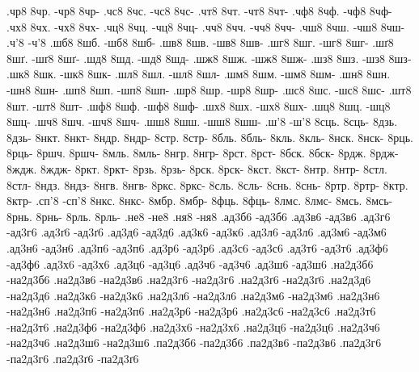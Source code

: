 {.чр8 8чр. -чр8 8чр-
.чс8 8чс. -чс8 8чс-
.чт8 8чт. -чт8 8чт-
.чф8 8чф. -чф8 8чф-
.чх8 8чх. -чх8 8чх-
.чц8 8чц. -чц8 8чц-
.чч8 8чч. -чч8 8чч-
.чш8 8чш. -чш8 8чш-
.ч'8 -ч'8
.шб8 8шб. -шб8 8шб-
.шв8 8шв. -шв8 8шв-
.шг8 8шг. -шг8 8шг-
.шґ8 8шґ. -шґ8 8шґ-
.шд8 8шд. -шд8 8шд-
.шж8 8шж. -шж8 8шж-
.шз8 8шз. -шз8 8шз-
.шк8 8шк. -шк8 8шк-
.шл8 8шл. -шл8 8шл-
.шм8 8шм. -шм8 8шм-
.шн8 8шн. -шн8 8шн-
.шп8 8шп. -шп8 8шп-
.шр8 8шр. -шр8 8шр-
.шс8 8шс. -шс8 8шс-
.шт8 8шт. -шт8 8шт-
.шф8 8шф. -шф8 8шф-
.шх8 8шх. -шх8 8шх-
.шц8 8шц. -шц8 8шц-
.шч8 8шч. -шч8 8шч-
.шш8 8шш. -шш8 8шш-
.ш'8 -ш'8
%
%
%
8сць. 8сць-
8дзь. 8дзь-
8нкт. 8нкт-
8ндр. 8ндр-
8стр. 8стр-
8бль. 8бль-
8кль. 8кль-
8нск. 8нск-
8рць. 8рць-
8ршч. 8ршч-
8мль. 8мль-
8нгр. 8нгр-
8рст. 8рст-
8бск. 8бск-
8рдж. 8рдж-
8ждж. 8ждж-
8ркт. 8ркт-
8рзь. 8рзь-
8рск. 8рск-
8кст. 8кст-
8нтр. 8нтр-
8стл. 8стл-
8ндз. 8ндз-
8нгв. 8нгв-
8ркс. 8ркс-
8сль. 8сль-
8снь. 8снь-
8ртр. 8ртр-
8ктр. 8ктр-
.сп'8 -сп'8
8нкс. 8нкс-
8мбр. 8мбр-
8фць. 8фць-
8лмс. 8лмс-
8мсь. 8мсь-
8рнь. 8рнь-
8рль. 8рль-
%
%
%
.не8 -не8
.ня8 -ня8
%
%
%
.ад3б6 -ад3б6
.ад3в6 -ад3в6
.ад3г6 -ад3г6
.ад3ґ6 -ад3ґ6
.ад3д6 -ад3д6
.ад3к6 -ад3к6
.ад3л6 -ад3л6
.ад3м6 -ад3м6
.ад3н6 -ад3н6
.ад3п6 -ад3п6
.ад3р6 -ад3р6
.ад3с6 -ад3с6
.ад3т6 -ад3т6
.ад3ф6 -ад3ф6
.ад3х6 -ад3х6
.ад3ц6 -ад3ц6
.ад3ч6 -ад3ч6
.ад3ш6 -ад3ш6
.на2д3б6 -на2д3б6
.на2д3в6 -на2д3в6
.на2д3г6 -на2д3г6
.на2д3ґ6 -на2д3ґ6
.на2д3д6 -на2д3д6
.на2д3к6 -на2д3к6
.на2д3л6 -на2д3л6
.на2д3м6 -на2д3м6
.на2д3н6 -на2д3н6
.на2д3п6 -на2д3п6
.на2д3р6 -на2д3р6
.на2д3с6 -на2д3с6
.на2д3т6 -на2д3т6
.на2д3ф6 -на2д3ф6
.на2д3х6 -на2д3х6
.на2д3ц6 -на2д3ц6
.на2д3ч6 -на2д3ч6
.на2д3ш6 -на2д3ш6
.па2д3б6 -па2д3б6
.па2д3в6 -па2д3в6
.па2д3г6 -па2д3г6
.па2д3ґ6 -па2д3ґ6
}
